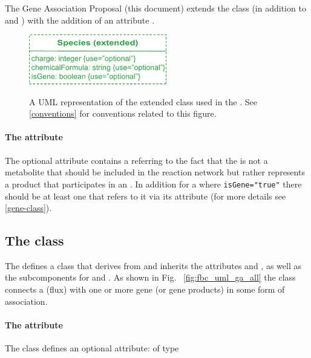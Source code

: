 The \FBCPackage \textsf{Gene Association Proposal} (this document) extends the \sbmlthreecore \Species class (in addition to  and ) with the addition of an attribute .
%
\begin{figure}[h!]
  \centering
  \includegraphics[width=6cm]{images/fbc_uml_species-v2.pdf}\\
  \caption{A UML representation of the extended \SBML \Species class used in
  the \FBCPackage. See \ref{conventions} for conventions related to this
  figure.}
  \label{fig:fbc_uml_species_ga}
\end{figure}

\paragraph{The  attribute}
The optional attribute  contains a  referring to the fact that the \Species is not a metabolite that should be included in the reaction network but rather represents a \Gene product that participates in an \Association. In addition for a \Species where \verb+isGene="true"+ there should be at least one \Gene that refers to it via its  attribute (for more details see \ref{gene-class}).
%

\subsection{The \FBC {} class}
\label{geneassociation-class}

The \FBCPackage defines a \GeneAssociation class that derives from \SBase and inherits the attributes  and , as well as the subcomponents for \Annotation and \Notes. As shown in Fig.~ \ref{fig:fbc_uml_ga_all} the \GeneAssociation class connects a \Reaction (flux) with one or more gene (or gene products) in some form of association.

\paragraph{The  attribute}
The \GeneAssociation class defines an optional attribute:  of type 

